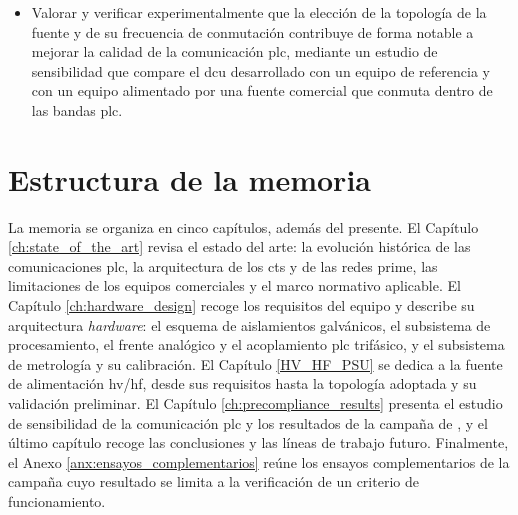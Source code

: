 \begin{itemize}
    \item Valorar y verificar experimentalmente que la elección de la topología de la fuente y de su frecuencia de conmutación contribuye de forma notable a mejorar la calidad de la comunicación \gls{plc}, mediante un estudio de sensibilidad que compare el \gls{dcu} desarrollado con un equipo de referencia y con un equipo alimentado por una fuente comercial que conmuta dentro de las bandas \gls{plc}.
\end{itemize}

\section{Estructura de la memoria}
\label{sec:estructura_memoria}

La memoria se organiza en cinco capítulos, además del presente. El Capítulo \ref{ch:state_of_the_art} revisa el estado del arte: la evolución histórica de las comunicaciones \gls{plc}, la arquitectura de los \glspl{ct} y de las redes \gls{prime}, las limitaciones de los equipos comerciales y el marco normativo aplicable. El Capítulo \ref{ch:hardware_design} recoge los requisitos del equipo y describe su arquitectura \textit{hardware}: el esquema de aislamientos galvánicos, el subsistema de procesamiento, el frente analógico y el acoplamiento \gls{plc} trifásico, y el subsistema de metrología y su calibración. El Capítulo \ref{HV_HF_PSU} se dedica a la fuente de alimentación \gls{hv}/\gls{hf}, desde sus requisitos hasta la topología adoptada y su validación preliminar. El Capítulo \ref{ch:precompliance_results} presenta el estudio de sensibilidad de la comunicación \gls{plc} y los resultados de la campaña de , y el último capítulo recoge las conclusiones y las líneas de trabajo futuro. Finalmente, el Anexo \ref{anx:ensayos_complementarios} reúne los ensayos complementarios de la campaña cuyo resultado se limita a la verificación de un criterio de funcionamiento.